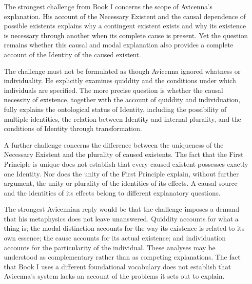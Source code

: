 \label{para:VS.B01.P01.C08.S13.SS16.P001}

The strongest
challenge from
Book I
concerns the
scope of
Avicenna's explanation.
His account
of the
Necessary Existent
and the
causal dependence
of possible
existents explains
why a
contingent existent
exists and
why its
existence is
necessary through
another when
its complete
cause is
present. Yet
the question
remains whether
this causal
and modal
explanation also
provides a
complete account
of the
Identity of
the caused
existent.

\label{para:VS.B01.P01.C08.S13.SS16.P002}

The challenge
must not
be formulated
as though
Avicenna ignored
whatness or
individuality. He
explicitly examines
quiddity and
the conditions
under which
individuals are
specified. The
more precise
question is
whether the
causal necessity
of existence,
together with
the account
of quiddity
and individuation,
fully explains
the ontological
status of
Identity, including
the possibility
of multiple
identities,
the relation
between Identity
and internal
plurality, and
the conditions
of Identity
through transformation.

\label{para:VS.B01.P01.C08.S13.SS16.P003}

A further
challenge concerns
the difference
between the
uniqueness of
the Necessary
Existent and
the plurality
of caused
existents. The
fact that
the First
Principle is
unique does
not establish
that every
caused existent
possesses exactly
one Identity.
Nor does
the unity
of the
First Principle
explain, without
further argument,
the unity
or plurality
of the
identities of
its effects. A
causal source
and the
identities of
its effects
belong to
different explanatory
questions.

\label{para:VS.B01.P01.C08.S13.SS16.P004}

The strongest
Avicennian reply
would be
that the
challenge imposes
a demand
that his
metaphysics does
not leave
unanswered. Quiddity
accounts for
what a
thing is;
the modal
distinction accounts
for the
way its
existence is
related to
its own
essence; the
cause accounts
for its
actual existence;
and individuation
accounts for
the particularity
of the
individual. These
analyses may
be understood
as complementary
rather than
as competing
explanations. The
fact that
Book I
uses a
different foundational
vocabulary does
not establish
that Avicenna's
system lacks
an account
of the
problems it
sets out
to explain.

